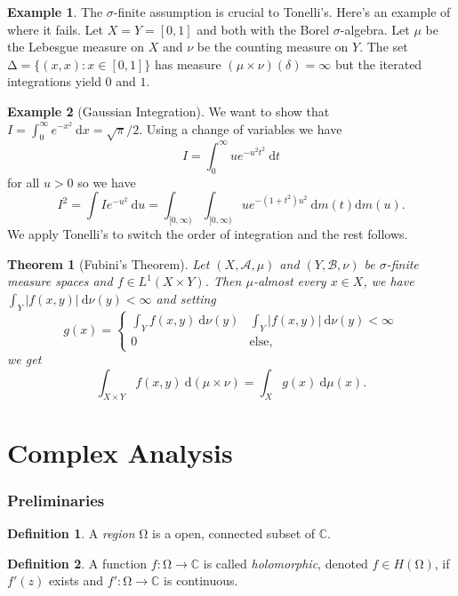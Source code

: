 \documentclass[letterpaper,12pt]{article}
\theoremstyle{definition}
\newtheorem{definition}{Definition}[section]
\newtheorem{example}{Example}[section]
\theoremstyle{plain}
\newtheorem{thm}{Theorem}[section]
\theoremstyle{remark}
\newcommand{\C}{\mathbb{C}}
\let\oldOmega\Omega
\renewcommand{\Omega}{\mathrm{\oldOmega}}
\let\oldDelta\Delta
\renewcommand{\Delta}{\mathrm{\oldDelta}}
\begin{document}
\begin{example}
The $\sigma$-finite assumption is crucial to Tonelli's. Here's an example of where it fails. Let $X=Y=[0,1]$ and both with the Borel $\sigma$-algebra. Let $\mu$ be the Lebesgue measure on $X$ and $\nu$ be the counting measure on $Y$. The set $\Delta = \{(x,x):x\in[0,1]\}$ has measure $(\mu\times\nu)(\delta) = \infty$ but the iterated integrations yield $0$ and $1$.
\end{example}

\begin{example}[Gaussian Integration]
We want to show that $I = \int_0^\infty e^{-x^2}\ \mathrm{d}x = \sqrt{\pi}/2$. Using a change of variables we have
\[I = \int_0^\infty ue^{-u^2t^2}\ \mathrm{d}t\]
for all $u>0$ so we have
\[I^2 = \int Ie^{-u^2}\ \mathrm{d}u = \int_{[0,\infty)}\int_{[0,\infty)}ue^{-(1+t^2)u^2}\ \mathrm{d}m(t)\mathrm{d}m(u).\]
We apply Tonelli's to switch the order of integration and the rest follows.
\end{example}

\begin{thm}[Fubini's Theorem]
Let $(X,\mathcal{A},\mu)$ and $(Y,\mathcal{B},\nu)$ be $\sigma$-finite measure spaces and $f\in L^1(X\times Y)$. Then $\mu$-almost every $x\in X$, we have $\int_Y |f(x,y)|\ \mathrm{d}\nu(y)<\infty$ and setting
\[
g(x) = \begin{cases}
\int_Y f(x,y)\ \mathrm{d}\nu(y) & \int_Y |f(x,y)|\ \mathrm{d}\nu(y)<\infty \\
0 & \text{else},
\end{cases}
\]
we get
\[\int_{X\times Y}f(x,y)\ \mathrm{d}(\mu\times\nu) = \int_X g(x)\ \mathrm{d}\mu(x).\]
\end{thm}


\newpage

\part{Complex Analysis}

\section{Preliminaries}

\begin{definition}
A \emph{region} $\Omega$ is a open, connected subset of $\C$.
\end{definition}

\begin{definition}
A function $f:\Omega\to\C$ is called \emph{holomorphic}, denoted $f\in H(\Omega)$, if $f'(z)$ exists and $f':\Omega\to\C$ is continuous.
\end{definition}
\end{document}
